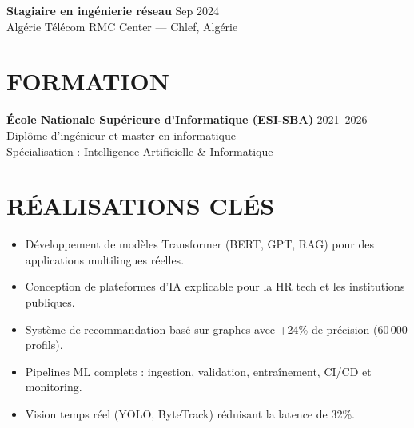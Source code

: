 \documentclass[a4paper,12pt]{article}
\begin{document}
\textbf{Stagiaire en ingénierie réseau} \hfill Sep 2024 \\
Algérie Télécom RMC Center — Chlef, Algérie

\section{FORMATION}
\textbf{École Nationale Supérieure d’Informatique (ESI-SBA)} \hfill 2021--2026 \\
Diplôme d’ingénieur et master en informatique \\
Spécialisation : Intelligence Artificielle \& Informatique

\section{RÉALISATIONS CLÉS}
\begin{itemize}
    \item Développement de modèles Transformer (BERT, GPT, RAG) pour des applications multilingues réelles.
    \item Conception de plateformes d’IA explicable pour la HR tech et les institutions publiques.
    \item Système de recommandation basé sur graphes avec +24\% de précision (60\,000 profils).
    \item Pipelines ML complets : ingestion, validation, entraînement, CI/CD et monitoring.
    \item Vision temps réel (YOLO, ByteTrack) réduisant la latence de 32\%.
\end{itemize}

\newpage

\end{document}
